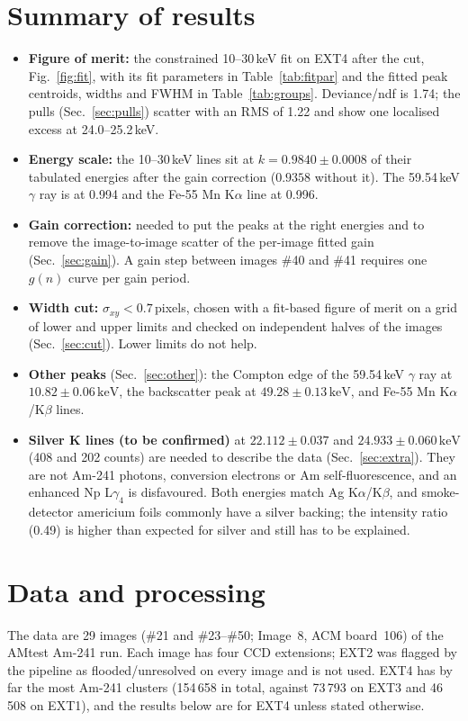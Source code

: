\documentclass[11pt,a4paper]{article}
\newcommand{\sxy}{\sigma_{xy}}
\newcommand{\keV}{\,\mathrm{keV}}
\begin{document}
\section{Summary of results}
\begin{itemize}
\item \textbf{Figure of merit:} the constrained 10--30\,keV fit on EXT4 after the cut,
Fig.~\ref{fig:fit}, with its fit parameters in Table~\ref{tab:fitpar} and the fitted peak centroids, widths and
FWHM in Table~\ref{tab:groups}. Deviance/ndf is 1.74; the pulls (Sec.~\ref{sec:pulls}) scatter with an RMS of 1.22
and show one localised excess at 24.0--25.2\,keV.
\item \textbf{Energy scale:} the 10--30\,keV lines sit at $k = 0.9840 \pm 0.0008$ of their tabulated
energies after the gain correction ($0.9358$ without it). The 59.54\,keV $\gamma$ ray is at 0.994 and the Fe-55
Mn K$\alpha$ line at 0.996.
\item \textbf{Gain correction:} needed to put the peaks at the right energies and to remove the image-to-image
scatter of the per-image fitted gain (Sec.~\ref{sec:gain}). A gain step between images \#40 and \#41
requires one $g(n)$ curve per gain period.
\item \textbf{Width cut:} $\sxy<0.7$\,pixels, chosen with a fit-based figure of merit on a grid of lower and
upper limits and checked on independent halves of the images (Sec.~\ref{sec:cut}). Lower limits do not help.
\item \textbf{Other peaks} (Sec.~\ref{sec:other}): the Compton edge of the 59.54\,keV $\gamma$ ray at
$10.82 \pm 0.06\keV$, the backscatter peak at $49.28 \pm 0.13\keV$, and Fe-55 Mn K$\alpha$/K$\beta$ lines.
\item \textbf{Silver K lines (to be confirmed)} at $22.112\pm0.037$ and $24.933\pm0.060\keV$ (408 and 202
counts) are needed to describe the data (Sec.~\ref{sec:extra}). They are not Am-241 photons, conversion electrons
or Am self-fluorescence, and an enhanced Np L$\gamma_4$ is disfavoured. Both energies match Ag K$\alpha$/K$\beta$, and
smoke-detector americium foils commonly have a silver backing; the intensity ratio (0.49) is higher than expected
for silver and still has to be explained.
\end{itemize}

\section{Data and processing}
\label{sec:data}
The data are 29 images (\#21 and \#23--\#50; Image~8, ACM board~106) of the AMtest Am-241 run.
Each image has four CCD extensions; EXT2 was flagged by the pipeline as flooded/unresolved on every image and is not
used. EXT4 has by far the most Am-241 clusters (154\,658 in total, against 73\,793 on EXT3 and 46\,508 on EXT1), and
the results below are for EXT4 unless stated otherwise.
\end{document}
